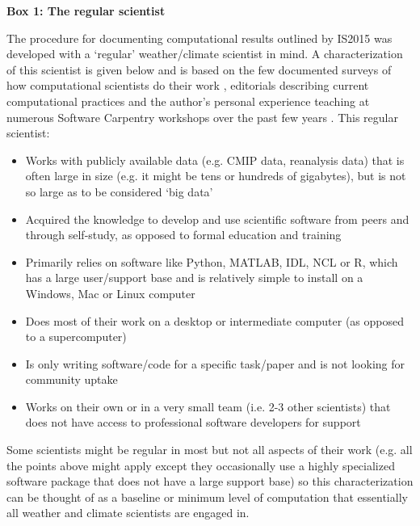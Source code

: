 \textbf{Box 1: The regular scientist}

The procedure for documenting computational results outlined by IS2015 was developed with a `regular' weather/climate scientist in mind. A characterization of this scientist is given below and is based on the few documented surveys of how computational scientists do their work \citep{Hannay2009,Stodden2010}, editorials describing current computational practices \citep[e.g.][]{Easterbrook2014} and the author's personal experience teaching at numerous Software Carpentry workshops over the past few years \citep{Wilson2014}. This regular scientist:
\begin{itemize}
\item Works with publicly available data (e.g. CMIP data, reanalysis data) that is often large in size (e.g. it might be tens or hundreds of gigabytes), but is not so large as to be considered `big data' 
\item Acquired the knowledge to develop and use scientific software from peers and through self-study, as opposed to formal education and training
\item Primarily relies on software like Python, MATLAB, IDL, NCL or R, which has a large user/support base and is relatively simple to install on a Windows, Mac or Linux computer
\item Does most of their work on a desktop or intermediate computer (as opposed to a supercomputer)
\item Is only writing software/code for a specific task/paper and is not looking for community uptake  
\item Works on their own or in a very small team (i.e. 2-3 other scientists) that does not have access to professional software developers for support
\end{itemize}

Some scientists might be regular in most but not all aspects of their work (e.g. all the points above might apply except they occasionally use a highly specialized software package that does not have a large support base) so this characterization can be thought of as a baseline or minimum level of computation that essentially all weather and climate scientists are engaged in.  

  
  
  
  
  